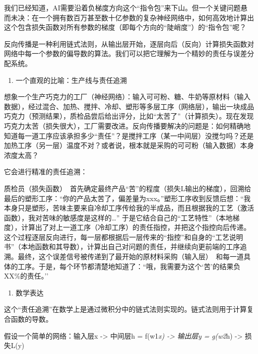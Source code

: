 我们已经知道，AI需要沿着负梯度方向这个``指令包''来下山。但一个关键问题悬而未决：在一个拥有数百万甚至数十亿参数的复杂神经网络中，如何高效地计算出这个包含损失函数对所有参数的梯度（即每个方向的``陡峭度''）的``指令包''呢？

反向传播是一种利用链式法则，从输出层开始，逐层向后（反向）计算损失函数对网络中每一个参数的偏导数的算法。我们可以把它理解为一个精妙的责任与误差分配系统。

\begin{enumerate}
\def\labelenumi{\arabic{enumi}.}
\tightlist
\item
  一个直观的比喻：生产线与责任追溯
\end{enumerate}

想象一个生产巧克力的工厂（神经网络）：输入可可粉、糖、牛奶等原材料（输入数据），经过混合、加热、搅拌、冷却、塑形等多层工序（网络层），输出一块成品巧克力（预测结果），质检品尝后给出评分，比如``太苦了''（计算损失）。现在发现巧克力太苦（损失很大），工厂需要改进。反向传播要解决的问题是：如何精确地知道每一道工序应该承担多少``责任''？是搅拌工序（某一中间层）没搅匀吗？还是加热工序（另一层）温度不对？或者说，根本就是采购的可可粉（输入数据）本身浓度太高？

它会进行精准的责任追溯：

质检员（损失函数）~首先确定最终产品``苦''的程度（损失L输出的梯度），回溯给最后的塑形工序：``你的产品太苦了，偏差量为xxx。''塑形工序收到反馈后想：``我本身只是塑形，苦味主要来自冷却工序传给我的半成品，而且根据我的工艺（激活函数），我对苦味的敏感度是这样的\ldots{}'' 于是它结合自己的``工艺特性''（本地梯度），计算出了对上一道工序（冷却工序）的责任指控，并把这个指控向后传递。这个过程逐层反向进行，每一层都根据后一层传来的``指控''和自身的``工艺说明书''（本地函数和其导数），计算出自己对问题的责任，并继续向更前端的工序追溯。最终，这个误差信号被传递到了最开始的原材料采购（输入层）~和每一道具体的工序。于是，每个环节都清楚地知道了：``哦，我需要为这个`苦'的结果负XX\%的责任。''

\begin{enumerate}
\def\labelenumi{\arabic{enumi}.}
\setcounter{enumi}{1}
\tightlist
\item
  数学表达
\end{enumerate}

这个``责任追溯''在数学上是通过微积分中的链式法则实现的。链式法则用于计算复合函数的导数。

假设一个简单的网络：输入层x -\textgreater{} 中间层h = f(w1\emph{x) -\textgreater{} 输出层y = g(w2}h) -\textgreater{} 损失L(y)

